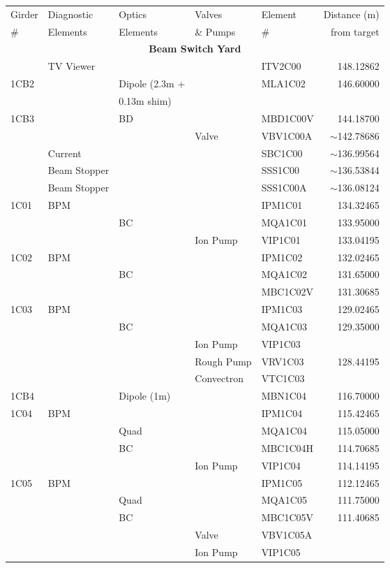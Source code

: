\begin{longtable}[hpt]{lllllr}
\hline
Girder & Diagnostic & Optics & Valves & Element & Distance (m) \\
\# & Elements & Elements & \& Pumps & \# & from target \\ \hline
\multicolumn{6}{c}{{\bf Beam Switch Yard}} \\ \hline 
& TV Viewer &&&ITV2C00 & 148.12862 \\ 
1CB2 & & Dipole (2.3m + & & MLA1C02 & 146.60000 \\
&&0.13m shim) &&& \\
1CB3 && BD && MBD1C00V & 144.18700 \\
&&&Valve & VBV1C00A & $\sim$142.78686 \\
& Current &&& SBC1C00 & $\sim$136.99564 \\
& Beam Stopper &&& SSS1C00 & $\sim$136.53844 \\
& Beam Stopper &&& SSS1C00A & $\sim$136.08124 \\
1C01 & BPM &&& IPM1C01 & 134.32465 \\
&& BC && MQA1C01 & 133.95000 \\
&&& Ion Pump & VIP1C01 & 133.04195 \\
1C02 & BPM &&& IPM1C02 & 132.02465 \\
&& BC && MQA1C02 & 131.65000 \\
&&&& MBC1C02V & 131.30685 \\
1C03 & BPM &&& IPM1C03 & 129.02465 \\
&& BC && MQA1C03 & 129.35000 \\
&&& Ion Pump & VIP1C03 & \\
&&& Rough Pump & VRV1C03 & 128.44195 \\
&&& Convectron & VTC1C03 & \\
1CB4 && Dipole (1m) && MBN1C04 & 116.70000 \\
1C04 & BPM &&& IPM1C04 & 115.42465 \\
&& Quad && MQA1C04 & 115.05000 \\
&& BC && MBC1C04H & 114.70685 \\
&&& Ion Pump & VIP1C04 & 114.14195 \\
1C05 & BPM &&& IPM1C05 & 112.12465 \\
&& Quad && MQA1C05 & 111.75000 \\
&& BC && MBC1C05V & 111.40685 \\
&&& Valve & VBV1C05A & \\
&&& Ion Pump & VIP1C05 & \\

\end{longtable}
